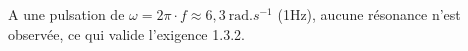 \fi


\ifprof
\begin{texteCache}

 A une pulsation de \(\omega=2\pi\cdot f\approx 6,3\ \text{rad.}s^{- 1}\) (1Hz), aucune résonance
  n'est observée, ce qui valide l'exigence 1.3.2.

 
 \vspace{1.5cm}

\end{texteCache}
\else


\fi

%
%
%
%
%
%
%
%
